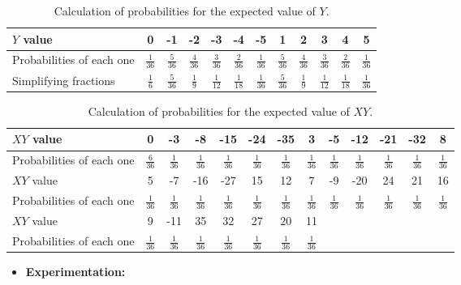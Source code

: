\documentclass{article}
\begin{document}
 \begin{table}[]\caption{Calculation of probabilities for the expected value of $Y$.}\label{tab2}
\centering
\begin{tabular}{| p{2cm} | c | c | c | c | c | c | c | c | c | c | c |}
\hline
$Y$ value & 0 & -1 & -2 & -3 & -4 & -5 & 1 & 2 & 3 & 4 & 5 \\
\hline 
Probabilities of each one & $\frac{1}{36}$& $\frac{5}{36}$& $\frac{4}{36}$& $\frac{3}{36}$& $\frac{2}{36}$& $\frac{1}{36}$& $\frac{5}{36}$& $\frac{4}{36}$& $\frac{3}{36}$& $\frac{2}{36}$& $\frac{1}{36}$\\
\hline 
Simplifying fractions& $\frac{1}{6}$& $\frac{5}{36}$& $\frac{1}{9}$& $\frac{1}{12}$& $\frac{1}{18}$& $\frac{1}{36}$& $\frac{5}{36}$& $\frac{1}{9}$& $\frac{1}{12}$& $\frac{1}{18}$& $\frac{1}{36}$\\
\hline
\end{tabular}
\end{table}


 \begin{table}[]\caption{Calculation of probabilities for the expected value of $XY$.}\label{tab3}
\centering
\begin{tabular}{| p{2cm} | c | c | c | c | c | c | c | c | c | c | c | c | }
\hline
$XY$ value & 0 & -3 & -8 & -15 &-24 & -35 & 3 & -5 & -12 & -21 & -32 & 8  \\
\hline 
Probabilities of each one & $\frac{6}{36}$& $\frac{1}{36}$& $\frac{1}{36}$& $\frac{1}{36}$& $\frac{1}{36}$& $\frac{1}{36}$& $\frac{1}{36}$& $\frac{1}{36}$& $\frac{1}{36}$& $\frac{1}{36}$& $\frac{1}{36}$& $\frac{1}{36}$\\
\hline
\hline
$XY$ value & 5 & -7 & -16 & -27 &15 & 12 & 7 & -9 & -20 & 24 & 21 & 16  \\
\hline 
Probabilities of each one & $\frac{1}{36}$& $\frac{1}{36}$& $\frac{1}{36}$& $\frac{1}{36}$& $\frac{1}{36}$& $\frac{1}{36}$& $\frac{1}{36}$& $\frac{1}{36}$& $\frac{1}{36}$& $\frac{1}{36}$& $\frac{1}{36}$& $\frac{1}{36}$\\
\hline
\hline
$XY$ value & 9 & -11 & 35 & 32 &27 & 20 & 11 &  &  &  &  &   \\
\hline 
Probabilities of each one & $\frac{1}{36}$& $\frac{1}{36}$& $\frac{1}{36}$& $\frac{1}{36}$& $\frac{1}{36}$& $\frac{1}{36}$& $\frac{1}{36}$& & & & & \\
\hline
\end{tabular}
\end{table}



\begin{itemize}
\item \textbf{Experimentation:}
\end{itemize}
\end{document}
